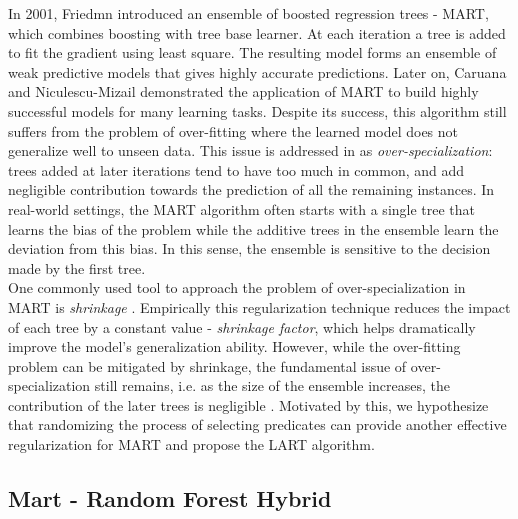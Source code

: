 \documentclass{article} %
\begin{document}
In 2001, Friedmn \cite{mart} introduced an ensemble of boosted regression trees - MART, which combines boosting with tree base learner. At each iteration a tree is added to fit the gradient using least square. The resulting model forms an ensemble of weak predictive models that gives highly accurate predictions. Later on, Caruana and Niculescu-Mizail \cite{Caruana06anempirical} demonstrated the application of MART to build highly successful models for many learning tasks. Despite its success, this algorithm still suffers from the problem of over-fitting where the learned model does not generalize well to unseen data. This issue is addressed in \cite{VinayakG15} as \textit{over-specialization}: trees added at later iterations tend to have too much in common, and add negligible contribution towards the prediction of all the remaining instances. In real-world settings, the MART algorithm often starts with a single tree that learns the bias of the problem while the additive trees in the ensemble learn the deviation from this bias. In this sense, the ensemble is sensitive to the decision made by the first tree.\\

One commonly used tool to approach the problem of over-specialization in MART is \textit{shrinkage} \cite{mart}. Empirically this regularization technique reduces the impact of each tree by a constant value - \textit{shrinkage factor}, which helps dramatically improve the model's generalization ability. However, while the over-fitting problem can be mitigated by shrinkage, the fundamental issue of over-specialization still remains, i.e. as the size of the ensemble increases, the contribution of the later trees is negligible \cite{VinayakG15}. Motivated by this, we hypothesize that randomizing the process of selecting predicates can provide another effective regularization for MART and propose the LART algorithm.


\subsection{Mart - Random Forest Hybrid}

\end{document}
